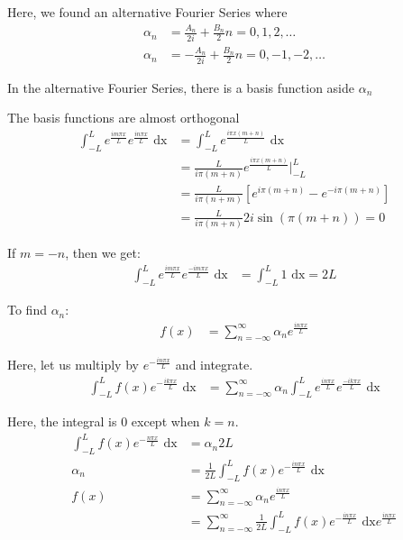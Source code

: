 Here, we found an alternative Fourier Series where
%
\begin{align}
  \alpha_n & = \frac{A_n}{2i} + \frac{B_n}{2}  n = 0, 1, 2, \ldots\\
  \alpha_n & = -\frac{A_n}{2i} + \frac{B_n}{2} n = 0, -1, -2, \ldots
\end{align}

In the alternative Fourier Series, there is a basis function aside $\alpha_n$

The basis functions are almost orthogonal
%
\begin{align}
  \int^L_{-L}
  e^{\frac{i m \pi x}{L}} e^{\frac{i n \pi x}{L}} \text{ dx} & =
  \int^L_{-L}
  e^{\frac{i \pi x (m + n)}{L}} \text{ dx}\\
  & = \frac{L}{i \pi(m + n)} e^{\frac{i \pi x(m + n)}{L}} \Big|^L_{-L}\\
  & = \frac{L}{i \pi(n + m)} \left[ e^{i \pi(m + n)} - e^{-i \pi(m + n)} \right]\\
  & = \frac{L}{i \pi(m + n)} 2 i \sin(\pi(m + n)) = 0
\end{align}

If $m = -n$, then we get:
%
\begin{align}
  \int^L_{-L} e^{\frac{i m \pi x}{L}} e^{\frac{-i m \pi x}{L}} \text{ dx}
  & = \int^L_{-L} 1 \text{ dx} = 2L
\end{align}

To find $\alpha_n$:
%
\begin{align}
  f(x) & = \sum^\infty_{n = - \infty} \alpha_n e^{\frac{i n \pi x}{L}}
\end{align}

Here, let us multiply by $e^{-\frac{i n \pi x}{L}}$ and integrate.
%
\begin{align}
  \int^L_{-L} f(x)e^{-\frac{i k \pi x}{L}} \text{ dx} & =
  \sum^\infty_{n = -\infty} \alpha_n \int^L_{-L} e^{\frac{i n \pi x}{L}} e^{\frac{-i k \pi x}{L}} \text{ dx}
\end{align}

Here, the integral is $0$ except when $k = n$.
%
\begin{align}
  \int^L_{-L} f(x) e^{- \frac{n \pi x}{L}} \text{ dx} & = \alpha_n 2L\\
  \alpha_n & = \frac{1}{2L} \int^L_{-L} f(x)e^{-\frac{i n \pi x}{L}} \text{ dx}\\
  f(x) & = \sum^\infty_{n = -\infty} \alpha_n e^{\frac{i n \pi x}{L}}\\
  & = \sum^\infty_{n = -\infty} \frac{1}{2L} \int^L_{-L} f(x) e^{- \frac{i n \pi x}{L}} \text{ dx} e^{\frac{i n \pi x}{L}}
\end{align}


